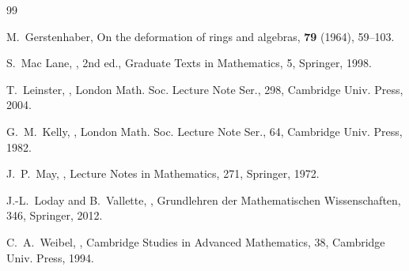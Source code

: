 \documentclass[11pt,a4paper]{article}
\numberwithin{equation}{section}
\begin{document}
	\begin{thebibliography}{99}
		
		M.~Gerstenhaber,
		\newblock On the deformation of rings and algebras,
		 \textbf{79} (1964), 59--103.
		
		S.~Mac Lane,
		,
		\newblock 2nd ed., Graduate Texts in Mathematics, 5, Springer, 1998.
		
		T.~Leinster,
		,
		\newblock London Math. Soc. Lecture Note Ser., 298, Cambridge Univ. Press, 2004.
		
		G.~M.~Kelly,
		,
		\newblock London Math. Soc. Lecture Note Ser., 64, Cambridge Univ. Press, 1982.
		
		J.~P.~May,
		,
		\newblock Lecture Notes in Mathematics, 271, Springer, 1972.
		
		J.-L.~Loday and B.~Vallette,
		,
		\newblock Grundlehren der Mathematischen Wissenschaften, 346, Springer, 2012.
		
		C.~A.~Weibel,
		,
		\newblock Cambridge Studies in Advanced Mathematics, 38, Cambridge Univ. Press, 1994.
		
	\end{thebibliography}
	
\end{document}
